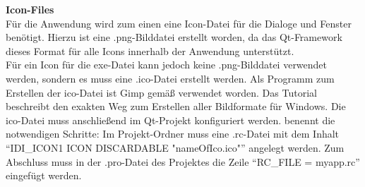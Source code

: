 \textbf{Icon-Files}\\
Für die Anwendung wird zum einen eine Icon-Datei für die Dialoge und Fenster benötigt. Hierzu ist eine .png-Bilddatei erstellt worden, da das Qt-Framework dieses Format für alle Icons innerhalb der Anwendung unterstützt.\\
Für ein Icon für die exe-Datei kann jedoch keine .png-Bilddatei verwendet werden, sondern es muss eine .ico-Datei erstellt werden. Als Programm zum Erstellen der ico-Datei ist Gimp gemäß \cite{CreateICO} verwendet worden. Das Tutorial beschreibt den exakten Weg zum Erstellen aller Bildformate für Windows. Die ico-Datei muss anschließend im Qt-Projekt konfiguriert werden. \cite{SetICO} benennt die notwendigen Schritte: Im Projekt-Ordner muss eine .rc-Datei mit dem Inhalt "`IDI\_ICON1 ICON    DISCARDABLE "nameOfIco.ico""' angelegt werden. Zum Abschluss muss in der .pro-Datei des Projektes die Zeile "`RC\_FILE = myapp.rc"' eingefügt werden.\bigskip \\

